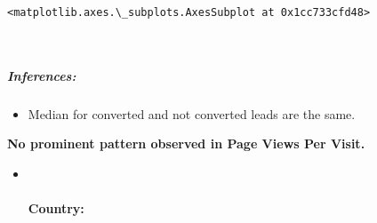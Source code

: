 \documentclass[11pt]{article}
\makeatletter
\providecommand{\tightlist}{%
      \setlength{\itemsep}{0pt}\setlength{\parskip}{0pt}}
\newcommand{\boxspacing}{\kern\kvtcb@left@rule\kern\kvtcb@boxsep}
\newcommand{\prompt}[4]{
        \ttfamily\llap{{\color{#2}[#3]:\hspace{3pt}#4}}\vspace{-\baselineskip}
    }
\makeatother
\begin{document}
            \begin{tcolorbox}[breakable, size=fbox, boxrule=.5pt, pad at break*=1mm, opacityfill=0]
\prompt{Out}{outcolor}{40}{\boxspacing}
\begin{Verbatim}[commandchars=\\\{\}]
<matplotlib.axes.\_subplots.AxesSubplot at 0x1cc733cfd48>
\end{Verbatim}
\end{tcolorbox}
        
    \begin{center}
    \end{center}
    { \hspace*{\fill} \\}
    
    \hypertarget{inferences}{%
\subparagraph{Inferences:}\label{inferences}}

\begin{itemize}
\tightlist
\item
  Median for converted and not converted leads are the same.
\end{itemize}

\textbf{No prominent pattern observed in Page Views Per Visit.}

    \begin{itemize}
\item ~
  \hypertarget{country}{%
  \paragraph{Country:}\label{country}}
\end{itemize}
\end{document}
